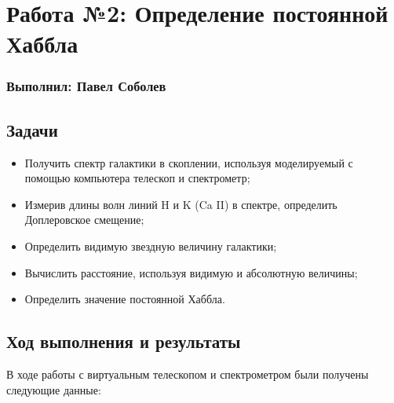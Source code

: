 

\usepackage[lmargin=23mm]{geometry}



\section*{Работа №2: Определение постоянной Хаббла}
\subsubsection*{Выполнил: Павел Соболев}

\vspace{3em}

\subsection*{Задачи}

\begin{itemize}
  \setlength\itemsep{-0.1em}
  \item Получить спектр галактики в скоплении, используя моделируемый с помощью компьютера телескоп и спектрометр;
  \item Измерив длины волн линий H и K (Ca II) в спектре, определить Доплеровское смещение;
  \item Определить видимую звездную величину галактики;
  \item Вычислить расстояние, используя видимую и абсолютную величины;
  \item Определить значение постоянной Хаббла.
\end{itemize}

\subsection*{Ход выполнения и результаты}

В ходе работы с виртуальным телескопом и спектрометром были получены следующие данные:

